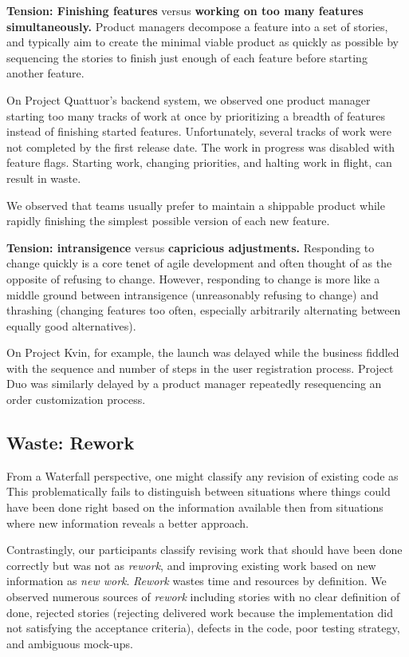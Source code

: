 \textbf{Tension: Finishing features} versus \textbf{working on too many features simultaneously.}
Product managers decompose a feature into a set of stories, and typically aim to create the minimal viable product as quickly as possible by sequencing the stories to finish just enough of each feature before starting another feature. 

On Project Quattuor's backend system, we observed one product manager starting too many tracks of work at once by prioritizing a breadth of features instead of finishing started features. Unfortunately, several tracks of work were not completed by the first release date. The work in progress was disabled with feature flags. Starting work, changing priorities, and halting work in flight, can result in waste.

We observed that teams usually prefer to maintain a shippable product while rapidly finishing the simplest possible version of each new feature.

\textbf{Tension: intransigence} versus \textbf{capricious adjustments.}
Responding to change quickly is a core tenet of agile development and often thought of as the opposite of refusing to change. However, responding to change is more like a middle ground between intransigence (unreasonably refusing to change) and thrashing (changing features too often, especially arbitrarily alternating between equally good alternatives). 

On Project Kvin, for example, the launch was delayed while the business fiddled with the sequence and number of steps in the user registration process. Project Duo was similarly delayed by a product manager repeatedly resequencing an order customization process. 
\subsection{Waste: Rework}
From a Waterfall perspective, one might classify any revision of existing code as  This problematically fails to distinguish between situations where things could have been done right based on the information available then from situations where new information reveals a better approach. 

Contrastingly, our participants classify revising work that should have been done correctly but was not as \textit{rework}, and improving existing work based on new information as \textit{new work}. \textit{Rework} wastes time and resources by definition. We observed numerous sources of \textit{rework} including stories with no clear definition of done, rejected stories (rejecting delivered work because the implementation did not satisfying the acceptance criteria), defects in the code, poor testing strategy, and ambiguous mock-ups.

